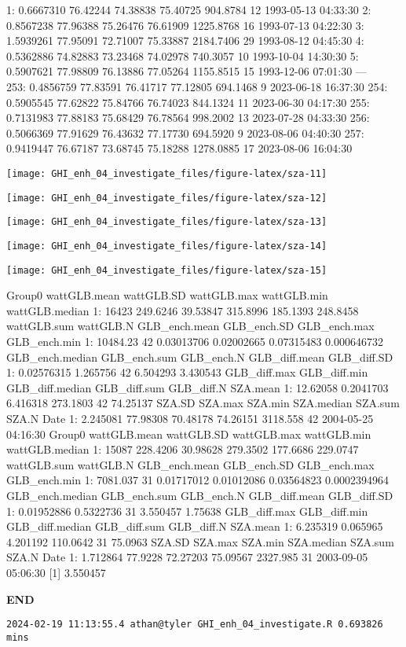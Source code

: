 \documentclass[
  10pt,
  a4paper,oneside]{article}
\begin{document}
1: 0.6667310 76.42244 74.38838 75.40725 904.8784 12 1993-05-13 04:33:30
2: 0.8567238 77.96388 75.26476 76.61909 1225.8768 16 1993-07-13 04:22:30
3: 1.5939261 77.95091 72.71007 75.33887 2184.7406 29 1993-08-12 04:45:30
4: 0.5362886 74.82883 73.23468 74.02978 740.3057 10 1993-10-04 14:30:30
5: 0.5907621 77.98809 76.13886 77.05264 1155.8515 15 1993-12-06 07:01:30
---\\
253: 0.4856759 77.83591 76.41717 77.12805 694.1468 9 2023-06-18 16:37:30
254: 0.5905545 77.62822 75.84766 76.74023 844.1324 11 2023-06-30 04:17:30
255: 0.7131983 77.88183 75.68429 76.78564 998.2002 13 2023-07-28 04:33:30
256: 0.5066369 77.91629 76.43632 77.17730 694.5920 9 2023-08-06 04:40:30
257: 0.9419447 76.67187 73.68745 75.18288 1278.0885 17 2023-08-06 16:04:30

\begin{center}\texttt{[image: GHI\_enh\_04\_investigate\_files/figure-latex/sza-11]} \end{center}

\begin{center}\texttt{[image: GHI\_enh\_04\_investigate\_files/figure-latex/sza-12]} \end{center}

\begin{center}\texttt{[image: GHI\_enh\_04\_investigate\_files/figure-latex/sza-13]} \end{center}

\begin{center}\texttt{[image: GHI\_enh\_04\_investigate\_files/figure-latex/sza-14]} \end{center}

\begin{center}\texttt{[image: GHI\_enh\_04\_investigate\_files/figure-latex/sza-15]} \end{center}

Group0 wattGLB.mean wattGLB.SD wattGLB.max wattGLB.min wattGLB.median
1: 16423 249.6246 39.53847 315.8996 185.1393 248.8458
wattGLB.sum wattGLB.N GLB\_ench.mean GLB\_ench.SD GLB\_ench.max GLB\_ench.min
1: 10484.23 42 0.03013706 0.02002665 0.07315483 0.000646732
GLB\_ench.median GLB\_ench.sum GLB\_ench.N GLB\_diff.mean GLB\_diff.SD
1: 0.02576315 1.265756 42 6.504293 3.430543
GLB\_diff.max GLB\_diff.min GLB\_diff.median GLB\_diff.sum GLB\_diff.N SZA.mean
1: 12.62058 0.2041703 6.416318 273.1803 42 74.25137
SZA.SD SZA.max SZA.min SZA.median SZA.sum SZA.N Date
1: 2.245081 77.98308 70.48178 74.26151 3118.558 42 2004-05-25 04:16:30
Group0 wattGLB.mean wattGLB.SD wattGLB.max wattGLB.min wattGLB.median
1: 15087 228.4206 30.98628 279.3502 177.6686 229.0747
wattGLB.sum wattGLB.N GLB\_ench.mean GLB\_ench.SD GLB\_ench.max GLB\_ench.min
1: 7081.037 31 0.01717012 0.01012086 0.03564823 0.0002394964
GLB\_ench.median GLB\_ench.sum GLB\_ench.N GLB\_diff.mean GLB\_diff.SD
1: 0.01952886 0.5322736 31 3.550457 1.75638
GLB\_diff.max GLB\_diff.min GLB\_diff.median GLB\_diff.sum GLB\_diff.N SZA.mean
1: 6.235319 0.065965 4.201192 110.0642 31 75.0963
SZA.SD SZA.max SZA.min SZA.median SZA.sum SZA.N Date
1: 1.712864 77.9228 72.27203 75.09567 2327.985 31 2003-09-05 05:06:30
{[}1{]} 3.550457

\textbf{END}

\begin{verbatim}
2024-02-19 11:13:55.4 athan@tyler GHI_enh_04_investigate.R 0.693826 mins
\end{verbatim}
\end{document}

